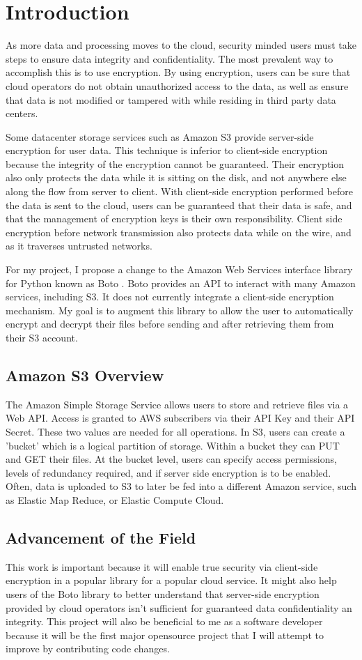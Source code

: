 \section{Introduction}
As more data and processing moves to the cloud, security minded users must take steps to ensure data integrity and confidentiality.
The most prevalent way to accomplish this is to use encryption. 
By using encryption, users can be sure that cloud operators do not
obtain unauthorized access to the data, as well as ensure that data is not modified or tampered with while residing in third party data centers.

Some datacenter storage services such as Amazon S3 \cite{amazons3} provide server-side encryption for user data. This technique is inferior to client-side encryption because the integrity of the encryption cannot be guaranteed.
Their encryption also only protects the data while it is sitting on the disk, and not anywhere else along the flow from server to client.
With client-side encryption performed before the data is sent to the cloud, users can be guaranteed that their data is safe, and that the management of encryption keys is their own responsibility. 
Client side encryption before network transmission also protects data while on the wire, and as it traverses untrusted networks.

For my project, I propose a change to the Amazon Web Services interface library for Python known as Boto \cite{boto}. Boto provides an API to interact with many Amazon services, including S3. It does not currently integrate a client-side encryption mechanism. My goal is to augment this library to allow the user to automatically encrypt and decrypt their files before sending and after retrieving them from their S3 account.

\subsection{Amazon S3 Overview}
The Amazon Simple Storage Service allows users to store and retrieve files via a Web API. Access is granted to AWS subscribers via their API Key and their API Secret. These two values are needed for all operations. In S3, users can create a 'bucket' which is a logical partition of storage. Within a bucket they can PUT and GET their files. At the bucket level, users can specify access permissions, levels of redundancy required, and if server side encryption is to be enabled. Often, data is uploaded to S3 to later be fed into a different Amazon service, such as Elastic Map Reduce, or Elastic Compute Cloud.

\subsection{Advancement of the Field}
This work is important because it will enable true security via client-side encryption in a popular library for a popular cloud service.
It might also help users of the Boto library to better understand that server-side encryption provided by cloud operators isn't sufficient for guaranteed data confidentiality an integrity.
This project will also be beneficial to me as a software developer because it will be the first major opensource project that I will attempt to improve by contributing code changes.
